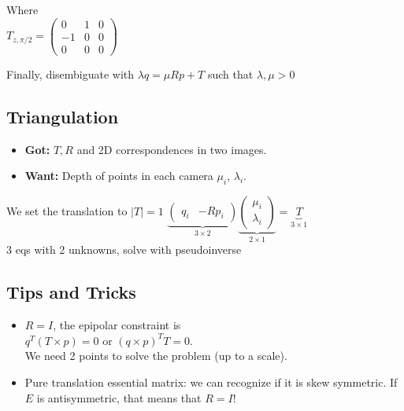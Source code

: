 Where\\
$T_{z, \pi/2} = \begin{pmatrix} 
  0 & 1 & 0 \\ -1 & 0 & 0\\ 0 & 0 & 0
\end{pmatrix}$

Finally, disembiguate with $\lambda q = \mu R p + T$ such that $\lambda,
\mu > 0$


\subsection*{Triangulation}
\begin{itemize}
  \item \textbf{Got:} $T, R$ and 2D correspondences in two images.
  \item \textbf{Want:} Depth of points in each camera $\mu_i$, $\lambda_i$.
\end{itemize}

We set the translation to $|T| = 1$
$\underbrace{\begin{pmatrix}q_i & -R p_i\end{pmatrix}}_{3\times2}
\underbrace{\begin{pmatrix} \mu_i \\\lambda_i \end{pmatrix}}_{2\times1} =
\underbrace{T}_{3 \times 1}$\\
3 eqs with 2 unknowns, solve with pseudoinverse

\subsection*{Tips and Tricks}
\begin{itemize}
  \item $R = I$, the epipolar constraint is\\
    $q^T ( T \times p) = 0$ or $(q \times p)^T T = 0$.\\
    We need 2 points to solve the problem (up to a scale).
  \item Pure translation essential matrix: we can recognize if it is
    skew symmetric. If $E$ is antisymmetric, that means that $R = I$!
\end{itemize}
